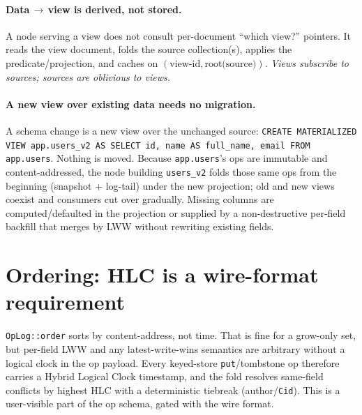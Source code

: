 \documentclass[10pt,twocolumn]{article}
\newcommand{\code}[1]{\texttt{\small #1}}
\newcommand{\Cid}{\code{Cid}}
\begin{document}
\paragraph{Data\,$\to$\,view is derived, not stored.} A node serving a view does not
consult per-document ``which view?'' pointers. It reads the view document, folds the
source collection(s), applies the predicate/projection, and caches on
$(\text{view-id},\text{root(source)})$. \emph{Views subscribe to sources; sources are
oblivious to views.}

\paragraph{A new view over existing data needs no migration.} A schema change is a new
view over the unchanged source: \code{CREATE MATERIALIZED VIEW app.users\_v2 AS SELECT
id, name AS full\_name, email FROM app.users}. Nothing is moved. Because
\code{app.users}'s ops are immutable and content-addressed, the node building
\code{users\_v2} folds those same ops from the beginning (snapshot + log-tail) under
the new projection; old and new views coexist and consumers cut over gradually.
Missing columns are computed/defaulted in the projection or supplied by a
non-destructive per-field backfill that merges by LWW without rewriting existing
fields.

\section{Ordering: HLC is a wire-format requirement}
\code{OpLog::order} sorts by content-address, not time. That is fine for a grow-only
set, but per-field LWW and any latest-write-wins semantics are arbitrary without a
logical clock in the op payload. Every keyed-store \code{put}/tombstone op therefore
carries a Hybrid Logical Clock timestamp, and the fold resolves same-field conflicts
by highest HLC with a deterministic tiebreak (author/\Cid{}). This is a user-visible
part of the op schema, gated with the wire format.
\end{document}
